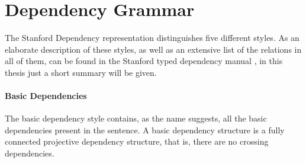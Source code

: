 \documentclass{report}
\theoremstyle{indented}
\begin{document}




\section{Dependency Grammar}




The Stanford Dependency representation distinguishes five different styles. As an elaborate description of these styles, as well as an extensive list of the relations in all of them, can be found in the Stanford typed dependency manual \citep{de2008stanford}, in this thesis just a short summary will be given.
\paragraph{Basic Dependencies} The basic dependency style contains, as the name suggests, all the basic dependencies present in the sentence. A basic dependency structure is a fully connected projective dependency structure, that is, there are no crossing dependencies.
\end{document}

